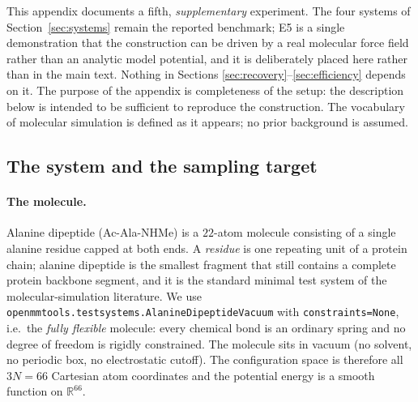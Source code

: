 \documentclass[11pt]{article}
\newcommand{\R}{\mathbb{R}}
\begin{document}
This appendix documents a fifth, \emph{supplementary} experiment.  The four
systems of Section~\ref{sec:systems} remain the reported benchmark; E5 is a
single demonstration that the construction can be driven by a real molecular
force field rather than an analytic model potential, and it is deliberately
placed here rather than in the main text.  Nothing in Sections
\ref{sec:recovery}--\ref{sec:efficiency} depends on it.  The purpose of the
appendix is completeness of the setup: the description below is intended to be
sufficient to reproduce the construction.  The vocabulary of molecular
simulation is defined as it appears; no prior background is assumed.

\subsection{The system and the sampling target}
\label{app:e5-system}

\paragraph{The molecule.}
Alanine dipeptide (Ac-Ala-NHMe) is a $22$-atom molecule consisting of a single
alanine residue capped at both ends.  A \emph{residue} is one repeating unit of
a protein chain; alanine dipeptide is the smallest fragment that still contains
a complete protein backbone segment, and it is the standard minimal test system
of the molecular-simulation literature.  We use
\texttt{openmmtools.testsystems.AlanineDipeptideVacuum} with
\texttt{constraints=None}, i.e.\ the \emph{fully flexible} molecule: every
chemical bond is an ordinary spring and no degree of freedom is rigidly
constrained.  The molecule sits in vacuum (no solvent, no periodic box, no
electrostatic cutoff).  The configuration space is therefore all $3N=66$
Cartesian atom coordinates and the potential energy is a smooth function on
$\R^{66}$.
\end{document}
